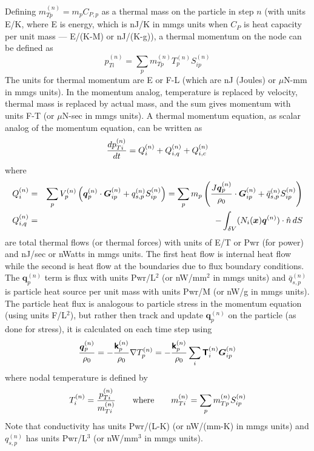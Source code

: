 \documentclass[11pt]{article}
\renewcommand{\vec}[1]{\boldsymbol{#1}}
\newcommand{\tens}[1]{\boldsymbol{\mathsf{#1}}}
\begin{document}
Defining $m_{Tp}^{(n)} = m_p C_{P,p}$ as a thermal mass on the particle in step $n$ (with units E/K, where E is energy, which is nJ/K in mmgs units when $C_{P}$ is heat capacity per unit mass --- E/(K-M) or nJ/(K-g)), a thermal momentum on the node can be defined as
\begin{equation}
      p_{Ti}^{(n)} = \sum_p  m_{Tp}^{(n)} T_p^{(n)} S^{(n)}_{ip}  
\end{equation}
The units for thermal momentum are E or F-L (which are nJ (Joules) or $\mu$N-mm in mmgs units). In the momentum analog, temperature is replaced by velocity, thermal mass is replaced by actual mass, and the sum gives momentum with units F-T (or $\mu$N-sec in mmgs units). A thermal momentum equation, as scalar analog of the momentum equation, can be written as
\begin{equation}
     {d p_{Ti}^{(n)}\over dt} = Q_{i}^{(n)} + Q_{i,q}^{(n)} + Q_{i,c}^{(n)}
\end{equation}
where
\begin{eqnarray}
      Q_{i}^{(n)} & = & \sum_p V_p^{(n)}  \left(\vec q_p^{(n)}\cdot \vec G^{(n)}_{ip}  + q_{s,p}^{(n)} S^{(n)}_{ip} \right) 
      =  \sum_p m_p\left( { J \vec q_p^{(n)}\over \rho_0}\cdot \vec G^{(n)}_{ip}  + \bar q_{s,p}^{(n)} S^{(n)}_{ip}\right) \\
      Q_{i,q}^{(n)} & = & -  \int_{\delta V} (N_i(\vec x)\vec q^{(n)})\cdot \hat n \thinspace dS 
\end{eqnarray}
are total thermal flows (or thermal forces) with units of E/T or Pwr (for power) and nJ/sec or nWatts in mmgs units. The first heat flow is internal heat flow while the second is heat flow at the boundaries due to flux boundary conditions. The $\vec q_p^{(n)}$ term is flux with units Pwr/L$^2$ (or nW/mm$^2$ in mmgs units) and $\bar q_{s,p}^{(n)}$ is particle heat source per unit mass with units Pwr/M (or nW/g in mmgs units). The particle heat flux is analogous to particle stress in the momentum equation (using units F/L$^2$), but rather then track and update $\vec q_p^{(n)}$ on the particle (as done for stress), it is calculated on each time step using
\begin{equation}
    {\vec q_p^{(n)}\over \rho_0} = -{\tens k_p^{(n)}\over \rho_0}\nabla T_p^{(n)} 
                                 = - {\tens k_p^{(n)}\over \rho_0}\sum_i \tens  T_i^{(n)} \vec G^{(n)}_{ip}
\end{equation}
where nodal temperature is defined by
\begin{equation}
       T_i^{(n)} = {p_{Ti}^{(n)} \over m_{Ti}^{(n)}} \qquad {\rm where } \qquad m_{Ti}^{(n)} = \sum_p  m_{Tp}^{(n)} S^{(n)}_{ip}  
\end{equation}
Note that conductivity has units Pwr/(L-K) (or nW/(mm-K) in mmgs units) and $q_{s,p}^{(n)}$ has units Pwr/L$^3$ (or nW/mm$^3$ in mmgs units).
\end{document}

